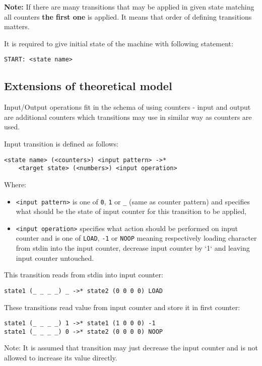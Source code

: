 \documentclass[english,shortabstract,mgr]{iithesis}
\begin{document}
\textbf{Note:} If there are many transitions that may be applied in given state
matching all counters \textbf{the first one} is applied. It means that order
of defining transitions matters.

It is required to give initial state of the machine with following statement:
\begin{verbatim}
START: <state name>
\end{verbatim}

\subsection {Extensions of theoretical model}

Input/Output operations fit in the schema of using counters - input and output
are additional counters which transitions may use in similar way as counters are used.

Input transition is defined as follows:
\begin{verbatim}
<state name> (<counters>) <input pattern> ->*
    <target state> (<numbers>) <input operation>
\end{verbatim}

Where:
\begin{itemize}
  \item \texttt{<input pattern>} is one of \texttt{0}, \texttt{1} or \texttt{\_}
      (same as counter pattern) and specifies what should be the state
      of input counter for this transition to be applied,
  \item \texttt{<input operation>} specifies what action should be performed
      on input counter and is one of \texttt{LOAD}, \texttt{-1} or \texttt{NOOP}
      meaning respectively loading character from stdin into the input counter,
      decrease input counter by `1` and leaving input counter untouched.
\end{itemize}

This transition reads from stdin into input counter:
\begin{verbatim}
state1 (_ _ _ _) _ ->* state2 (0 0 0 0) LOAD
\end{verbatim}

These transitions read value from input counter and store it in first counter:
\begin{verbatim}
state1 (_ _ _ _) 1 ->* state1 (1 0 0 0) -1
state1 (_ _ _ _) 0 ->* state2 (0 0 0 0) NOOP
\end{verbatim}

Note: It is assumed that transition may just decrease the input counter
and is not allowed to increase its value directly.
\end{document}
